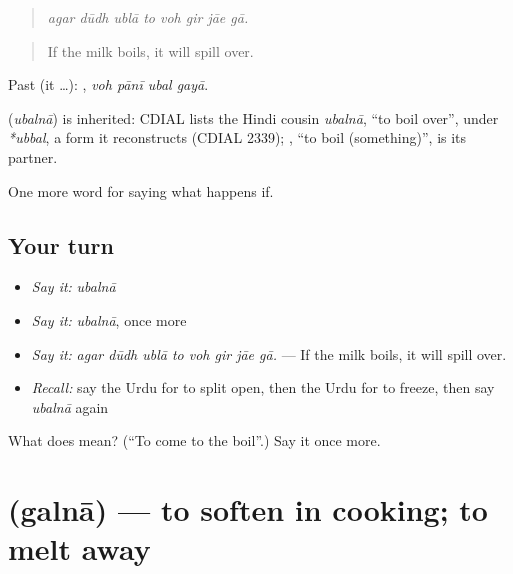 \begin{quote}
       
\end{quote}

\begin{quote}
\emph{agar dūdh ublā to voh gir jāe gā.}
\end{quote}

\begin{quote}
If the milk boils, it will spill over.
\end{quote}

Past (it …):    , \emph{voh pānī ubal gayā}.

\begin{cousinweb}
\textbf{} (\emph{ubalnā}) is inherited: CDIAL lists the Hindi cousin \emph{ubalnā}, \textquotedblleft{}to boil over\textquotedblright{}, under \emph{*ubbal}, a form it reconstructs (CDIAL 2339); \textbf{}, \textquotedblleft{}to boil (something)\textquotedblright{}, is its partner.
\end{cousinweb}

\begin{grammarlens}[title={What you've built}]
One more word for saying what happens if.
\end{grammarlens}

\subsection*{Your turn}
\begin{itemize}
\raggedright
  \item \emph{Say it:} \emph{ubalnā}
  \item \emph{Say it:} \emph{ubalnā}, once more
  \item \emph{Say it:} \emph{agar dūdh ublā to voh gir jāe gā.} — If the milk boils, it will spill over.
  \item \emph{Recall:} say the Urdu for to split open, then the Urdu for to freeze, then say \emph{ubalnā} again
\end{itemize}

\begin{tcolorbox}[breakable,colback=teal!4,colframe=teal!35!black,title={Before you move on}]
What does  mean? (\textquotedblleft{}To come to the boil\textquotedblright{}.) Say it once more.
\end{tcolorbox}
\section[\texorpdfstring{\ur{گلنا} (galnā)}{گلنا (galnā)}]{ (galnā) — to soften in cooking; to melt away}

